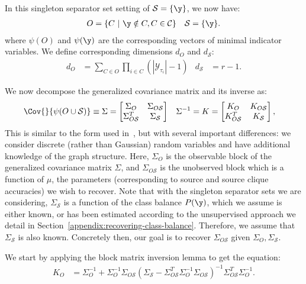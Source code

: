 \documentclass[letterpaper]{article}
\begin{document}
\begin{appendix}
In this singleton separator set setting of $\mathcal{S} = \{\y\}$, we now have:
\begin{align*}
	O
	&=
	\{ C ~|~ \y \notin C, C \in \mathcal{C} \}
	&
	\mathcal{S} = \{ \y \}.
\end{align*}
where $\psi(O)$ and $\psi(\y)$ are the corresponding vectors of minimal indicator variables.
We define corresponding dimensions $d_O$ and $d_\mathcal{S}$:
\begin{align*}
	d_O
	&=
	\sum_{C \in O} \prod_{i \in C} (|\mathcal{Y}_{\tau_i}|-1)
	&
	d_\mathcal{S}
	&=
	r-1.
\end{align*}

We now decompose the generalized covariance matrix and its inverse as:
\begin{align}
	\label{eqn:gen-cov}
	\Cov{}{ \psi(O \cup \mathcal{S}) }
	&\equiv
	\Sigma
	=
	\begin{bmatrix}
		\Sigma_O & \Sigma_{O\mathcal{S}} \\
		\Sigma_{O\mathcal{S}}^T & \Sigma_\mathcal{S}
	\end{bmatrix}
&
	\Sigma^{-1}
	&=
	K
	=
	\begin{bmatrix}
		K_O & K_{O\mathcal{S}} \\
		K_{O\mathcal{S}}^T & K_\mathcal{S}
	\end{bmatrix},
\end{align}
This is similar to the form used in~\cite{chandrasekaran2010latent}, but with several important differences: we consider discrete (rather than Gaussian) random variables and have additional knowledge of the graph structure.
Here, $\Sigma_O$ is the observable block of the generalized covariance matrix $\Sigma$, and $\Sigma_{O\mathcal{S}}$ is the unobserved block which is a function of $\mu$, the parameters (corresponding to source and source clique accuracies) we wish to recover.
Note that with the singleton separator sets we are considering, $\Sigma_\mathcal{S}$ is a function of the class balance $P(\y)$, which we assume is either known, or has been estimated according to the unsupervised approach we detail in Section~\ref{appendix:recovering-class-balance}.
Therefore, we assume that $\Sigma_\mathcal{S}$ is also known.
Concretely then, our goal is to recover $\Sigma_{O\mathcal{S}}$ given $\Sigma_O, \Sigma_\mathcal{S}$.

We start by applying the block matrix inversion lemma to get the equation:
\begin{align}
	\label{eqn:block-inv-cov}
	K_O
	&=
	\Sigma_O^{-1}
	+ \Sigma_O^{-1}\Sigma_{O\mathcal{S}}\left( \Sigma_\mathcal{S} - \Sigma_{O\mathcal{S}}^T\Sigma_O^{-1}\Sigma_{O\mathcal{S}} \right)^{-1} \Sigma_{O\mathcal{S}}^T\Sigma_O^{-1}.
\end{align}


\end{appendix}
\end{document}
